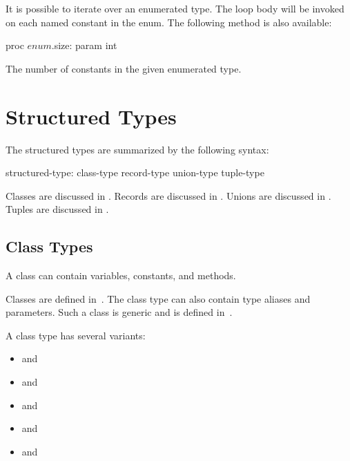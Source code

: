 It is possible to iterate over an enumerated type. The loop body will be
invoked on each named constant in the enum.
The following method is also available:

\begin{protohead}
proc $enum$.size: param int
\end{protohead}
\begin{protobody}
The number of constants in the given enumerated type.
\end{protobody}

\clearpage
\section{Structured Types}
\label{Structured_Types}

The structured types are summarized by the following syntax:

\begin{syntax}
structured-type:
  class-type
  record-type
  union-type
  tuple-type
\end{syntax}

Classes are discussed in .  Records are discussed
in .  Unions are discussed in .  Tuples are
discussed in .

\subsection{Class Types}
\label{Types_Class_Types}

A class can contain variables, constants, and methods.

Classes are defined
in~.  The class type can also contain type aliases and
parameters.  Such a class is generic and is defined
in~.

A class type  has several variants:
\begin{itemize}
  \item {} and 
  \item {} and 
  \item {} and 
  \item {} and 
  \item {} and 
\end{itemize}

